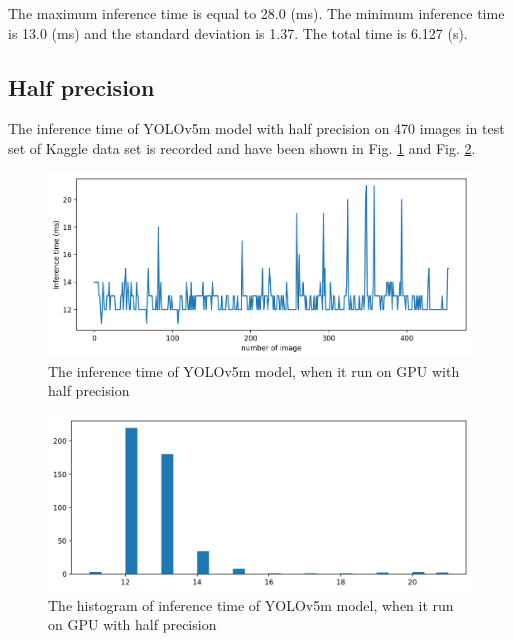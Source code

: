 \documentclass[12pt,a4paper]{article}
\begin{document}
The maximum inference time is equal to 28.0 (ms). The minimum inference time is 13.0 (ms) and the standard deviation is 1.37. The total time is 6.127 (s).

\subsection*{Half precision}
The inference time of YOLOv5m model with half precision on 470 images in test set of Kaggle data set is recorded and have been shown in Fig. \ref{fig: gpumh} and Fig. \ref{fig: gpumh_hist}.
\begin{figure}[H]
    \centering
    \includegraphics[width=15cm]{figures/Inftime_yolov5M_half.png}
    \caption{The inference time of YOLOv5m model, when it run on GPU with half precision}
    \label{fig: gpumh}
\end{figure}
\begin{figure}[H]
    \centering
    \includegraphics[width=15cm]{figures/Inftime_yolov5M_half_hist.png}
    \caption{The histogram of inference time of YOLOv5m model, when it run on GPU with half precision}
    \label{fig: gpumh_hist}
\end{figure}
\end{document}
